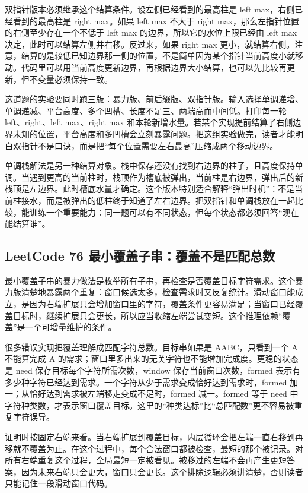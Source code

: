 双指针版本必须继承这个结算条件。设左侧已经看到的最高柱是 left max，右侧已经看到的最高柱是 right max。如果 left max 不大于 right max，那么左指针位置的右侧至少存在一个不低于 left max 的边界，所以它的水位上限已经由 left max 决定，此时可以结算左侧并右移。反过来，如果 right max 更小，就结算右侧。注意，结算的是较低已知边界那一侧的位置，不是简单因为某个指针当前高度小就移动。代码里可以用当前高度更新边界，再根据边界大小结算，也可以先比较再更新，但不变量必须保持一致。

这道题的实验要同时跑三版：暴力版、前后缀版、双指针版。输入选择单调递增、单调递减、平台高度、多个凹槽、长度不足三、两端高而中间低。打印每一轮 left、right、left max、right max 和本轮新增水量。若某个实现提前结算了右侧边界未知的位置，平台高度和多凹槽会立刻暴露问题。把这组实验做完，读者才能明白双指针不是口诀，而是把“每个位置需要左右最高”压缩成两个移动边界。

单调栈解法是另一种结算对象。栈中保存还没有找到右边界的柱子，且高度保持单调。当遇到更高的当前柱时，栈顶作为槽底被弹出，当前柱是右边界，弹出后的新栈顶是左边界。此时槽底水量才确定。这个版本特别适合解释“弹出时机”：不是当前柱接水，而是被弹出的低柱终于知道了左右边界。把双指针和单调栈放在一起比较，能训练一个重要能力：同一题可以有不同状态，但每个状态都必须回答“现在能结算谁”。

\subsection{LeetCode 76 最小覆盖子串：覆盖不是匹配总数}

最小覆盖子串的暴力做法是枚举所有子串，再检查是否覆盖目标字符需求。这个暴力版清楚地暴露两个重复：窗口候选太多，检查需求时又反复统计。滑动窗口能成立，是因为右端扩展只会增加窗口里的字符，覆盖条件更容易满足；当窗口已经覆盖目标时，继续扩展只会更长，所以应当收缩左端尝试变短。这个推理依赖“覆盖”是一个可增量维护的条件。

很多错误实现把覆盖理解成匹配字符总数。目标串如果是 AABC，只看到一个 A 不能算完成 A 的需求；窗口里多出来的无关字符也不能增加完成度。更稳的状态是 need 保存目标每个字符所需次数，window 保存当前窗口次数，formed 表示有多少种字符已经达到需求。一个字符从少于需求变成恰好达到需求时，formed 加一；从恰好达到需求被左端移走变成不足时，formed 减一。formed 等于 need 中字符种类数，才表示窗口覆盖目标。这里的“种类达标”比“总匹配数”更不容易被重复字符误导。

证明时按固定右端来看。当右端扩展到覆盖目标，内层循环会把左端一直右移到再移就不覆盖为止。在这个过程中，每个合法窗口都被检查，最短的那个被记录。对所有右端重复这个过程，全局最短一定被看见。被移过的左端不会再产生更短答案，因为未来右端只会更大，窗口只会更长。这个排除逻辑必须讲清楚，否则读者只能记住一段滑动窗口代码。

